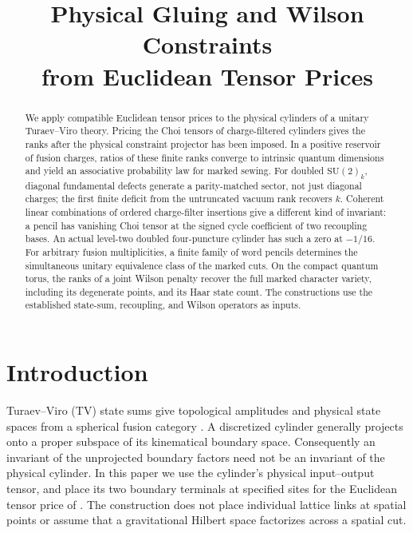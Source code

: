 \documentclass[11pt]{article}
\title{\bfseries Physical Gluing and Wilson Constraints\\[-1pt] from Euclidean Tensor Prices}
\author{}
\date{}
\numberwithin{equation}{section}
\theoremstyle{definition}
\theoremstyle{remark}
\newcommand{\su}{\mathrm{SU}(2)_k}
\begin{document}
\maketitle
\vspace{-1.2em}
\begin{abstract}
We apply compatible Euclidean tensor prices to the physical cylinders of a unitary Turaev--Viro theory. Pricing the Choi tensors of charge-filtered cylinders gives the ranks after the physical constraint projector has been imposed. In a positive reservoir of fusion charges, ratios of these finite ranks converge to intrinsic quantum dimensions and yield an associative probability law for marked sewing. For doubled \(\su\), diagonal fundamental defects generate a parity-matched sector, not just diagonal charges; the first finite deficit from the untruncated vacuum rank recovers \(k\). Coherent linear combinations of ordered charge-filter insertions give a different kind of invariant: a pencil has vanishing Choi tensor at the signed cycle coefficient of two recoupling bases. An actual level-two doubled four-puncture cylinder has such a zero at \(-1/16\). For arbitrary fusion multiplicities, a finite family of word pencils determines the simultaneous unitary equivalence class of the marked cuts. On the compact quantum torus, the ranks of a joint Wilson penalty recover the full marked character variety, including its degenerate points, and its Haar state count. The constructions use the established state-sum, recoupling, and Wilson operators as inputs.
\end{abstract}

\section{Introduction}

Turaev--Viro (TV) state sums give topological amplitudes and physical state spaces from a spherical fusion category \cite{TuraevViro,BalsamKirillov,BalsamII,BalsamIII}. A discretized cylinder generally projects onto a proper subspace of its kinematical boundary space. Consequently an invariant of the unprojected boundary factors need not be an invariant of the physical cylinder. In this paper we use the cylinder's physical input--output tensor, and place its two boundary terminals at specified sites for the Euclidean tensor price of \cite{OpenAIPrice}. The construction does not place individual lattice links at spatial points or assume that a gravitational Hilbert space factorizes across a spatial cut.
\end{document}
